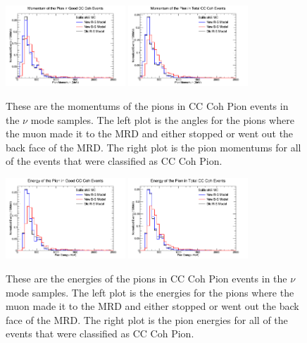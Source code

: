 \documentclass[11pt]{article}
\begin{document}
\begin{figure}[H]
\centering
\includegraphics[width=0.4\textwidth]{NMPionPlottingImages/8-NMPionPlotting.png}
\includegraphics[width=0.4\textwidth]{NMPionPlottingImages/11-NMPionPlotting.png}
\caption{These are the momentums of the pions in CC Coh Pion events in the $\nu$ mode samples. The left plot is the angles for the pions where the muon made it to the MRD and either stopped or went out the back face of the MRD. The right plot is the pion momentums for all of the events that were classified as CC Coh Pion.}
\end{figure}

\begin{figure}[H]
\centering
\includegraphics[width=0.4\textwidth]{NMPionPlottingImages/9-NMPionPlotting.png}
\includegraphics[width=0.4\textwidth]{NMPionPlottingImages/12-NMPionPlotting.png}
\caption{These are the energies of the pions in CC Coh Pion events in the $\nu$ mode samples. The left plot is the energies for the pions where the muon made it to the MRD and either stopped or went out the back face of the MRD. The right plot is the pion energies for all of the events that were classified as CC Coh Pion.}
\end{figure}
\end{document}
